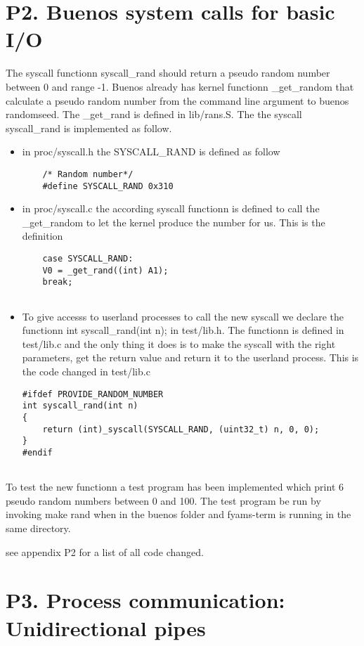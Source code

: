 \documentclass[a4paper,12pt,danish]{report}
\begin{document}
\section{P2. Buenos system calls for basic I/O}
The syscall functionn syscall\_rand should return a pseudo random number between
0 and range -1. Buenos already has kernel functionn \_get\_random that calculate
a pseudo random number from the command line argument to buenos randomseed.
The \_get\_rand is defined in lib/rans.S.
The the syscall syscall\_rand is implemented as follow.
\begin{itemize}
  \item in proc/syscall.h the SYSCALL\_RAND is defined as follow
  \begin{lstlisting}
  	/* Random number*/
	#define SYSCALL_RAND 0x310
  \end{lstlisting}
  \item in proc/syscall.c the according syscall functionn is defined to call the
  \_get\_random to let the kernel produce the number for us. This is the
  definition
  \begin{lstlisting}
  	case SYSCALL_RAND:
	V0 = _get_rand((int) A1);
	break;
  	
  \end{lstlisting}
  	
  \item To give accesss to userland processes to call the new syscall we declare
  the functionn int syscall\_rand(int n); in test/lib.h. The functionn is defined
  in test/lib.c and the only thing it does is to make the syscall with the right
  parameters, get the return value and return it to the userland process. This is
  the code changed in test/lib.c
  \begin{lstlisting}
#ifdef PROVIDE_RANDOM_NUMBER
int syscall_rand(int n)
{
  	return (int)_syscall(SYSCALL_RAND, (uint32_t) n, 0, 0);
}
#endif
  
  \end{lstlisting} 
\end{itemize}

To test the new functionn a test program has been implemented which print 6
pseudo random numbers between 0 and 100. The test program be run by invoking
make rand when in the buenos folder and fyams-term is running in the same directory.

see appendix P2 for a list of all code changed.

\newpage
\section{P3. Process communication: Unidirectional pipes}
\end{document}
